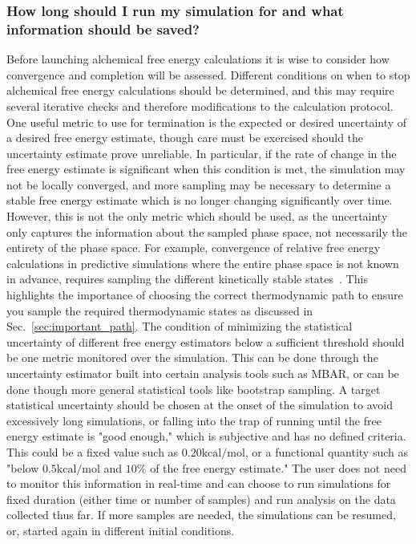\documentclass[9pt,bestpractices]{livecoms}
\begin{document}
\subsubsection{How long should I run my simulation for and what information should be saved?}
\label{sec:sim_length_information_kept}
Before launching alchemical free energy calculations it is wise to consider how convergence and completion will be assessed. Different conditions on when to stop alchemical free energy calculations should be determined, and this may require several iterative checks and therefore modifications to the calculation protocol.
One useful metric to use for termination is the expected or desired uncertainty of a desired free energy estimate, though care must be exercised should the uncertainty estimate prove unreliable.
In particular, if the rate of change in the free energy estimate is significant when this condition is met, the simulation may not be locally converged, and more sampling may be necessary to determine a stable free energy estimate which is no longer changing significantly over time. 
However, this is not the only metric which should be used, as the uncertainty only captures the information about the sampled phase space, not necessarily the entirety of the phase space.  
For example, convergence of relative free energy calculations in predictive simulations where the entire phase space is not known in advance, requires sampling the different kinetically stable states~\cite{mobley2012perspective}.  
This highlights the importance of choosing the correct thermodynamic path to ensure you sample the required thermodynamic states as discussed in Sec.~\ref{sec:important_path}.
%
The condition of minimizing the statistical uncertainty of different free energy estimators below a sufficient threshold should be one metric monitored over the simulation. This can be done through the uncertainty estimator built into certain analysis tools such as MBAR, or can be done though more general statistical tools like bootstrap sampling. 
A target statistical uncertainty should be chosen at the onset of the simulation to avoid excessively long simulations, or falling into the trap of running until the free energy estimate is "good enough," which is subjective and has no defined criteria. This could be a fixed value such as $0.20 \mathrm{kcal/mol}$, or a functional quantity such as "below $0.5 \mathrm{kcal/mol}$ and $10\%$ of the free energy estimate." The user does not need to monitor this information in real-time and can choose to run simulations for fixed duration (either time or number of samples) and run analysis on the data collected thus far. If more samples are needed, the simulations can be resumed, or, started again in different initial conditions. 
\end{document}
